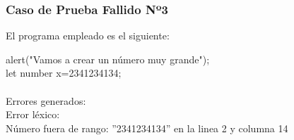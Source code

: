 \documentclass{article}
\begin{document}
\subsubsection{Caso de Prueba Fallido Nº3}
\begin{center} 
El programa empleado es el siguiente:
\end{center}
\begin{flushleft}
alert("Vamos a crear un número muy grande");\\
let number x=2341234134;\\
\quad\\
Errores generados:\\
Error léxico: \\
	\qquad Número fuera de rango: ''2341234134'' en la linea 2 y columna 14
	\end{flushleft}
\clearpage
\end{document}
